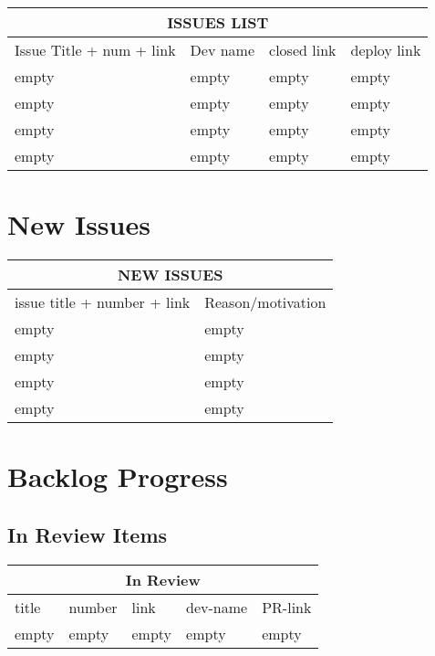 \documentclass{article}
\begin{document}
{
\begin{tabular}{ |p{2cm}|p{2cm}|p{2cm}|p{2cm}|  }
    \hline
    \multicolumn{4}{|c|}{ISSUES LIST}\\
    \hline
        Issue Title + num + link & Dev name & closed link & deploy link\\
    \hline
        empty & empty & empty & empty \\
        empty & empty & empty & empty \\
        empty & empty & empty & empty \\
        empty & empty & empty & empty \\
    \hline
\end{tabular}



\section{New Issues}
{
\begin{tabular}{ |p{4cm}|p{4cm}|  }
    \hline
    \multicolumn{2}{|c|}{NEW ISSUES}\\
    \hline
        issue title + number + link & Reason/motivation\\ 
    \hline
        empty & empty \\
        empty & empty \\
        empty & empty \\
        empty & empty \\
    \hline
\end{tabular}



\section{Backlog Progress}

\subsection{In Review Items}
\begin{tabular}{ |p{2cm}|p{2cm}|p{2cm}|p{2cm}|p{2cm}|  }
    \hline
    \multicolumn{5}{|c|}{In Review}\\
    \hline
        title & number & link & dev-name & PR-link\\
    \hline
        empty & empty & empty & empty & empty \\
    \hline
\end{tabular}

}}
\end{document}
